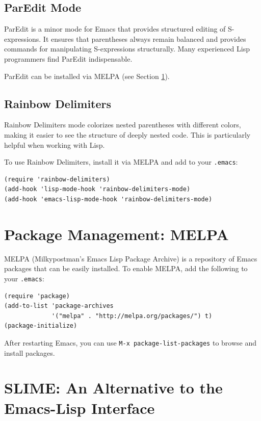 \subsection{ParEdit Mode}

ParEdit is a minor mode for Emacs that provides structured editing of S-expressions. It
ensures that parentheses always remain balanced and provides commands for manipulating
S-expressions structurally. Many experienced Lisp programmers find ParEdit indispensable.

ParEdit can be installed via MELPA (see Section \ref{sec:melpa}).

\subsection{Rainbow Delimiters}

Rainbow Delimiters mode colorizes nested parentheses with different colors, making it easier
to see the structure of deeply nested code. This is particularly helpful when working with
Lisp.

To use Rainbow Delimiters, install it via MELPA and add to your \texttt{.emacs}:

\begin{verbatim}
(require 'rainbow-delimiters)
(add-hook 'lisp-mode-hook 'rainbow-delimiters-mode)
(add-hook 'emacs-lisp-mode-hook 'rainbow-delimiters-mode)
\end{verbatim}

\section{Package Management: MELPA}
\label{sec:melpa}

MELPA (Milkypostman's Emacs Lisp Package Archive) is a repository of Emacs packages
that can be easily installed. To enable MELPA, add the following to your \texttt{.emacs}:

\begin{verbatim}
(require 'package)
(add-to-list 'package-archives
             '("melpa" . "http://melpa.org/packages/") t)
(package-initialize)
\end{verbatim}

After restarting Emacs, you can use \texttt{M-x package-list-packages} to browse and install
packages.

\section{SLIME: An Alternative to the Emacs-Lisp Interface}

